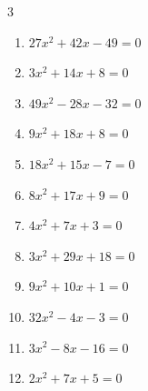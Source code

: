 \begin{multicols}{3}
\begin{enumerate}

  \item $27x^{2}+42x-49=0$


  \item $3x^{2}+14x+8=0$


  \item $49x^{2}-28x-32=0$


  \item $9x^{2}+18x+8=0$


  \item $18x^{2}+15x-7=0$


  \item $8x^{2}+17x+9=0$


  \item $4x^{2}+7x+3=0$


  \item $3x^{2}+29x+18=0$


  \item $9x^{2}+10x+1=0$


\columnbreak %

\resetques

  \item $32x^{2}-4x-3=0$


  \item $3x^{2}-8x-16=0$


  \item $2x^{2}+7x+5=0$



\end{enumerate}
\end{multicols}
